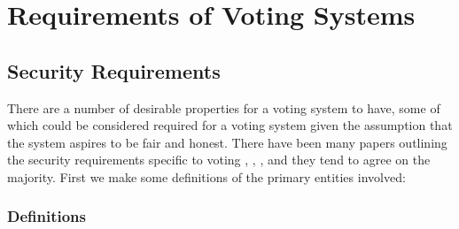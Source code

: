 
\chapter{Requirements of Voting Systems}
\label{ch:req}

\section{Security Requirements}
\label{ch:req:sec}

There are a number of desirable properties for a voting system to have, some of which could be considered required for a voting system given the assumption that the system aspires to be fair and honest. There have been many papers outlining the security requirements specific to voting \cite{epstein_electronic_2007}, \cite{delaune_formalising_2010}, \cite{li_taxonomy_2014}, and they tend to agree on the majority. First we make some definitions of the primary entities involved:

\subsection{Definitions}
\label{ch:req:defs}


